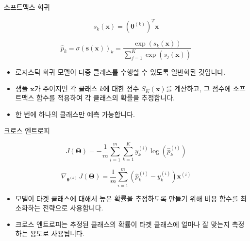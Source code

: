 \documentclass{beamer}
\numberwithin{equation}{section}
\begin{document}

\begin{frame}{소프트맥스 회귀}

\begin{equation}
s_k(\mathbf{x}) = ({\boldsymbol{\theta}^{(k)}})^T \mathbf{x}
\end{equation}

\begin{equation}
\hat{p}_k = \sigma\left(\mathbf{s}(\mathbf{x})\right)_k = \dfrac{\exp\left(s_k(\mathbf{x})\right)}{\sum\limits_{j=1}^{K}{\exp\left(s_j(\mathbf{x})\right)}}
\end{equation}

\begin{itemize}
\item 로지스틱 회귀 모델이 다중 클래스를 수행할 수 있도록 일반화된 것입니다.
\item 샘플 $\mathbf{x}$가 주어지면 각 클래스 $k$에 대한 점수 $S_K(\mathbf{x})$를 계산하고, 그 점수에 소프트맥스 함수를 적용하여 각 클래스의 확률을 추정합니다.
\item 한 번에 하나의 클래스만 예측 가능합니다.
\end{itemize}

\end{frame}


\begin{frame}{크로스 엔트로피}

\begin{equation}
J(\boldsymbol{\Theta}) = - \dfrac{1}{m}\sum\limits_{i=1}^{m}\sum\limits_{k=1}^{K}{y_k^{(i)}\log\left(\hat{p}_k^{(i)}\right)}
\end{equation}

\begin{equation}
\nabla_{\boldsymbol{\theta}^{(k)}} \, J(\boldsymbol{\Theta}) = \dfrac{1}{m} \sum\limits_{i=1}^{m}{ \left ( \hat{p}^{(i)}_k - y_k^{(i)} \right ) \mathbf{x}^{(i)}}
\end{equation}

\begin{itemize}
\item 모델이 타겟 클래스에 대해서 높은 확률을 추정하도록 만들기 위해 비용 함수를 최소화하는 전략으로 사용합니다.
\vskip 0.25cm
\item 크로스 엔트로피는 추정된 클래스의 확률이 타겟 클래스에 얼마나 잘 맞는지 측정하는 용도로 사용됩니다.
\end{itemize}

\end{frame}
\end{document}
